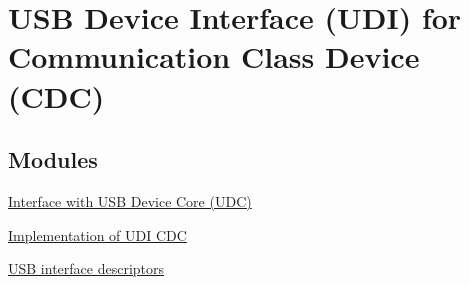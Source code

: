 \hypertarget{group__udi__cdc__group}{\section{U\-S\-B Device Interface (U\-D\-I) for Communication Class Device (C\-D\-C)}
\label{group__udi__cdc__group}
}
\subsection*{Modules}
\begin{DoxyCompactItemize}
\item 
\hyperlink{group__udi__cdc__group__udc}{Interface with U\-S\-B Device Core (\-U\-D\-C)}
\item 
\hyperlink{group__udi__cdc__group__internal}{Implementation of U\-D\-I C\-D\-C}
\item 
\hyperlink{group__udi__cdc__group__desc}{U\-S\-B interface descriptors}
\end{DoxyCompactItemize}
